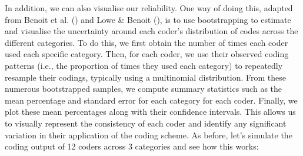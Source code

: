 \documentclass[
]{book}
\begin{document}
In addition, we can also visualise our reliability. One way of doing this, adapted from Benoit et al. () and Lowe \& Benoit (), is to use bootstrapping to estimate and visualise the uncertainty around each coder's distribution of codes across the different categories. To do this, we first obtain the number of times each coder used each specific category. Then, for each coder, we use their observed coding patterns (i.e., the proportion of times they used each category) to repeatedly resample their codings, typically using a multinomial distribution. From these numerous bootstrapped samples, we compute summary statistics such as the mean percentage and standard error for each category for each coder. Finally, we plot these mean percentages along with their confidence intervals. This allows us to visually represent the consistency of each coder and identify any significant variation in their application of the coding scheme. As before, let's simulate the coding output of 12 coders across 3 categories and see how this works:
\end{document}
